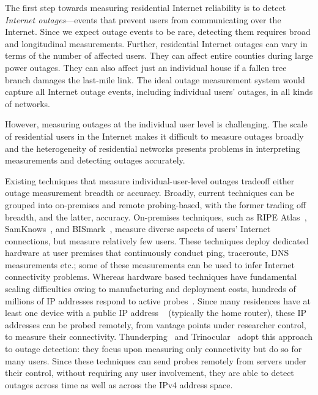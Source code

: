 

The first step towards measuring residential Internet
reliability is to detect \emph{Internet outages}---events that prevent
users from communicating over the Internet. Since we expect outage
events to be rare, detecting them requires broad and longitudinal
measurements. Further, residential Internet outages can vary in terms of the
number of affected users. They can affect entire counties during large power
outages. They can also affect just an individual house if a fallen tree
branch damages the last-mile link. The ideal outage measurement system
would capture all Internet outage events, including individual users'
outages, in all kinds of networks.

However, measuring outages at the individual user level is
challenging. The scale of residential users in the Internet makes it
difficult to measure outages broadly and the heterogeneity of
residential networks presents problems in interpreting measurements
and detecting outages accurately.

Existing techniques that measure individual-user-level outages
tradeoff either outage measurement breadth or accuracy. Broadly,
current techniques can be
grouped into on-premises and remote probing-based, with the former
trading off breadth, and the latter, accuracy. On-premises techniques, such as
RIPE Atlas~\cite{atlas}, SamKnows~\cite{samknows}, and
BISmark~\cite{bismark-main-bib}, measure diverse aspects of
users' Internet connections, but
measure relatively few users. These techniques 
deploy dedicated hardware at user premises that continuously conduct ping,
traceroute, DNS measurements etc.; some of these
measurements can be used to infer Internet connectivity problems. Whereas hardware
based techniques have fundamental scaling difficulties owing to
manufacturing and deployment costs, hundreds of millions of
IP addresses respond to active probes~\cite{timeouts}. Since many
residences have at least one device with a public IP address ~\cite{cgn-imc16}
(typically the home router), these IP addresses can be probed
remotely, from 
vantage points under researcher control, to measure their connectivity. Thunderping~\cite{pingin} and Trinocular~\cite{trinocular} adopt this
approach to outage detection: they focus upon
measuring only connectivity but do so for many users. Since these
techniques can send probes remotely from servers under their control, without requiring any user
involvement, they are able to detect outages across time
as well as across the IPv4 address space.

